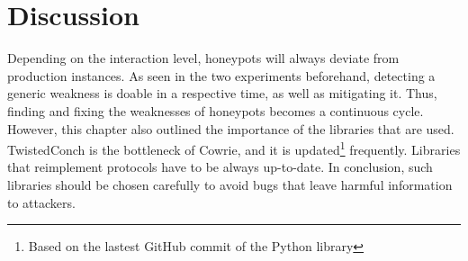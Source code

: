 \begin{figure}
    
\end{figure}

\section{Discussion}

Depending on the interaction level, honeypots will always deviate from production instances.
As seen in the two experiments beforehand, detecting a generic weakness is doable in a respective time, as well as mitigating it.
Thus, finding and fixing the weaknesses of honeypots becomes a continuous cycle.
However, this chapter also outlined the importance of the libraries that are used.
TwistedConch is the bottleneck of Cowrie, and it is updated\footnote{Based on the lastest GitHub commit of the Python library} frequently.
Libraries that reimplement protocols have to be always up-to-date.
In conclusion, such libraries should be chosen carefully to avoid bugs that leave harmful information to attackers.

